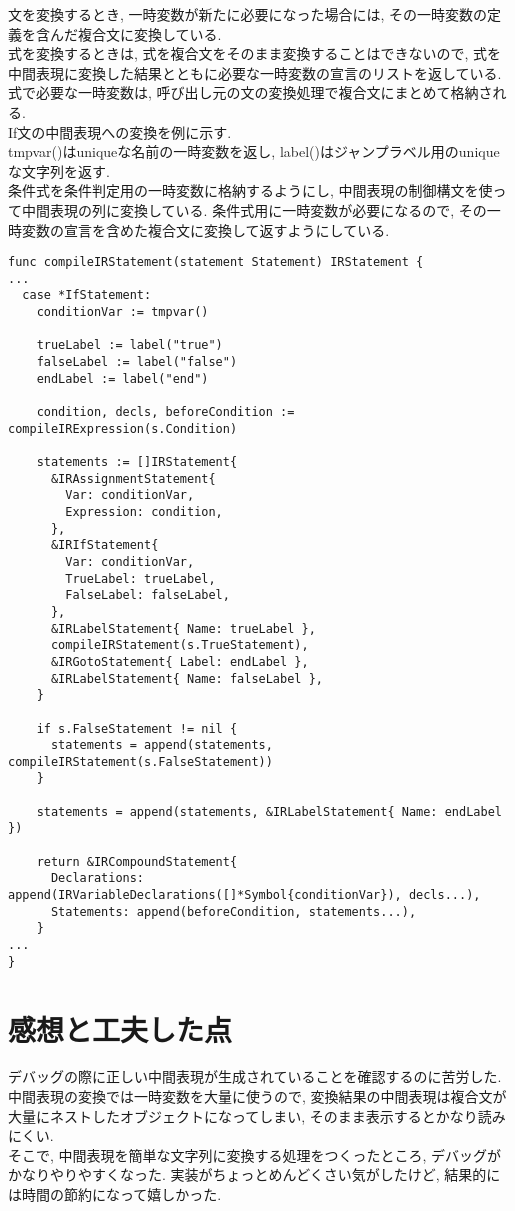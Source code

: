 \documentclass[a4j]{jarticle}
\begin{document}
文を変換するとき, 一時変数が新たに必要になった場合には, その一時変数の定義を含んだ複合文に変換している. \\

式を変換するときは, 式を複合文をそのまま変換することはできないので, 式を中間表現に変換した結果とともに必要な一時変数の宣言のリストを返している. 式で必要な一時変数は, 呼び出し元の文の変換処理で複合文にまとめて格納される. \\

If文の中間表現への変換を例に示す. \\

tmpvar()はuniqueな名前の一時変数を返し, label()はジャンプラベル用のuniqueな文字列を返す. \\

条件式を条件判定用の一時変数に格納するようにし, 中間表現の制御構文を使って中間表現の列に変換している. 条件式用に一時変数が必要になるので, その一時変数の宣言を含めた複合文に変換して返すようにしている. \\

\begin{verbatim}
func compileIRStatement(statement Statement) IRStatement {
...
  case *IfStatement:
    conditionVar := tmpvar()

    trueLabel := label("true")
    falseLabel := label("false")
    endLabel := label("end")

    condition, decls, beforeCondition := compileIRExpression(s.Condition)

    statements := []IRStatement{
      &IRAssignmentStatement{
        Var: conditionVar,
        Expression: condition,
      },
      &IRIfStatement{
        Var: conditionVar,
        TrueLabel: trueLabel,
        FalseLabel: falseLabel,
      },
      &IRLabelStatement{ Name: trueLabel },
      compileIRStatement(s.TrueStatement),
      &IRGotoStatement{ Label: endLabel },
      &IRLabelStatement{ Name: falseLabel },
    }

    if s.FalseStatement != nil {
      statements = append(statements, compileIRStatement(s.FalseStatement))
    }

    statements = append(statements, &IRLabelStatement{ Name: endLabel })

    return &IRCompoundStatement{
      Declarations: append(IRVariableDeclarations([]*Symbol{conditionVar}), decls...),
      Statements: append(beforeCondition, statements...),
    }
...
}
\end{verbatim}

\section{感想と工夫した点}
デバッグの際に正しい中間表現が生成されていることを確認するのに苦労した. \\

中間表現の変換では一時変数を大量に使うので, 変換結果の中間表現は複合文が大量にネストしたオブジェクトになってしまい, そのまま表示するとかなり読みにくい. \\

そこで, 中間表現を簡単な文字列に変換する処理をつくったところ, デバッグがかなりやりやすくなった. 実装がちょっとめんどくさい気がしたけど, 結果的には時間の節約になって嬉しかった. \\
\end{document}
